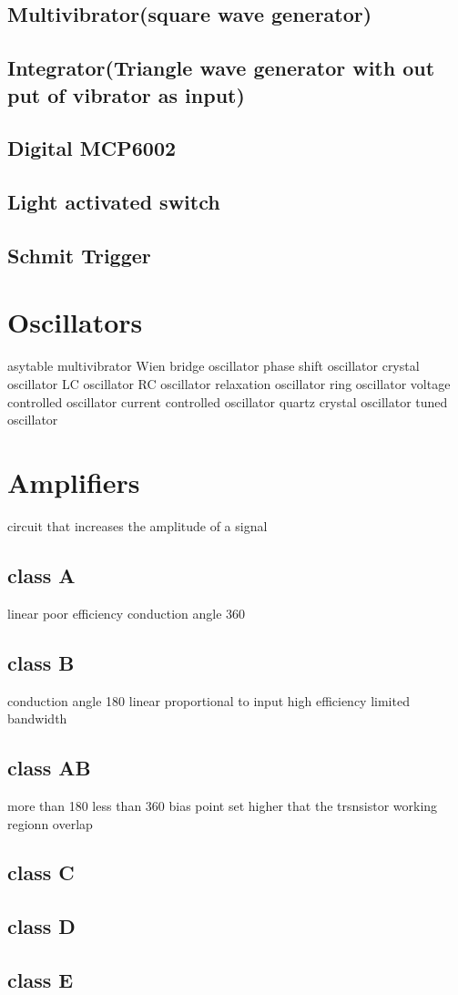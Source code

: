 \subsection{Multivibrator(square wave generator)}
\subsection{Integrator(Triangle wave generator with out put of vibrator as input)}

\subsection{Digital MCP6002}
\subsection{Light activated switch}
\subsection{Schmit Trigger}

\section{Oscillators}
asytable multivibrator
Wien bridge oscillator
phase shift oscillator
crystal oscillator
LC oscillator
RC oscillator
relaxation oscillator
ring oscillator
voltage controlled oscillator
current controlled oscillator
quartz crystal oscillator
tuned oscillator

\section{Amplifiers}
circuit that increases the amplitude of a signal
\subsection{class A}
linear
poor efficiency
conduction angle 360
\subsection{class B}
conduction angle 180
linear proportional to input
high efficiency
limited bandwidth
\subsection{class AB}
more than 180 less than 360
bias point set higher that the trsnsistor working regionn overlap 
\subsection{class C}
\subsection{class D}
\subsection{class E}
